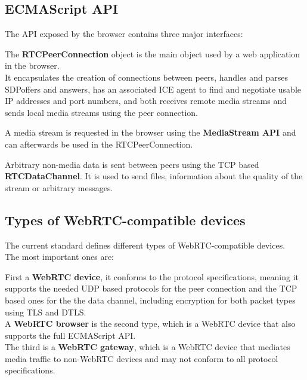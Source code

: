 \documentclass[../../../thesis.tex]{subfiles}
\begin{document}
\subsection{ECMAScript API}
The API exposed by the browser contains three major interfaces:\par
The \textbf{RTCPeerConnection} object is the main object used by a web application in the browser.\\
It encapsulates the creation of connections between peers\cite{ietf-rtcweb-jsep}, handles and parses SDP\footnotemark offers and answers, has an associated ICE agent to find and negotiate usable IP addresses and port numbers, and both receives remote media streams and sends local media streams using the peer connection.\par


A media stream is requested in the browser using the \textbf{MediaStream API}\cite[section 10.2.1]{mediacapture-streams} and can afterwards be used in the RTCPeerConnection.\par

Arbitrary non-media data is sent between peers using the TCP based \textbf{RTCDataChannel}\cite{ietf-rtcweb-data-channel}. It is used to send files, information about the quality of the stream or arbitrary messages.

\subsection{Types of WebRTC-compatible devices}
The current standard defines different types of WebRTC-compatible devices\cite[section 2.2]{ietf-rtcweb-overview}.\\
The most important ones are:\par
First a \textbf{WebRTC device}, it conforms to the protocol specifications, meaning it supports  the needed UDP based protocols for the peer connection and the TCP based ones for the the data channel, including encryption for both packet types using TLS and DTLS.\\

A \textbf{WebRTC browser} is the second type, which is a WebRTC device that also supports the full ECMAScript API.\\

The third is a \textbf{WebRTC gateway}, which is a WebRTC device that mediates media traffic to non-WebRTC devices and may not conform to all protocol specifications.\\
\end{document}
